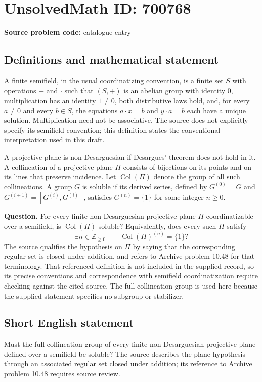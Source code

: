\documentclass[11pt]{article}
\newcommand{\Z}{\mathbb{Z}}
\begin{document}
\section*{UnsolvedMath ID: 700768}
\textbf{Source problem code:} catalogue entry
\subsection{Definitions and mathematical statement}
A finite semifield, in the usual coordinatizing convention, is a finite set \(S\) with operations \(+\) and \(\cdot\) such that \((S,+)\) is an abelian group with identity \(0\), multiplication has an identity \(1\ne0\), both distributive laws hold, and, for every \(a\ne0\) and every \(b\in S\), the equations \(a\cdot x=b\) and \(y\cdot a=b\) each have a unique solution. Multiplication need not be associative. The source does not explicitly specify its semifield convention; this definition states the conventional interpretation used in this draft.

A projective plane is non-Desarguesian if Desargues' theorem does not hold in it. A collineation of a projective plane \(\Pi\) consists of bijections on its points and on its lines that preserve incidence. Let \(\operatorname{Col}(\Pi)\) denote the group of all such collineations. A group \(G\) is soluble if its derived series, defined by \(G^{(0)}=G\) and \(G^{(i+1)}=[G^{(i)},G^{(i)}]\), satisfies \(G^{(n)}=\{1\}\) for some integer \(n\ge0\).

\textbf{Question.} For every finite non-Desarguesian projective plane \(\Pi\) coordinatizable over a semifield, is \(\operatorname{Col}(\Pi)\) soluble? Equivalently, does every such \(\Pi\) satisfy
\[
\exists n\in\Z_{\ge0}\qquad \operatorname{Col}(\Pi)^{(n)}=\{1\}?
\]
The source qualifies the hypothesis on \(\Pi\) by saying that the corresponding regular set is closed under addition, and refers to Archive problem 10.48 for that terminology. That referenced definition is not included in the supplied record, so its precise conventions and correspondence with semifield coordinatization require checking against the cited source. The full collineation group is used here because the supplied statement specifies no subgroup or stabilizer.
\subsection{Short English statement}
Must the full collineation group of every finite non-Desarguesian projective plane defined over a semifield be soluble? The source describes the plane hypothesis through an associated regular set closed under addition; its reference to Archive problem 10.48 requires source review.
\end{document}
